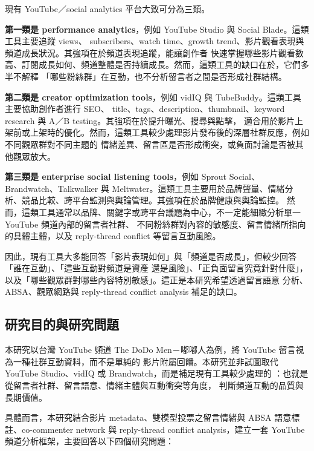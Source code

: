 現有 YouTube／social analytics 平台大致可分為三類。

\textbf{第一類是 performance analytics}，例如 YouTube Studio 與 Social Blade。這類工具主要追蹤 views、
subscribers、watch time、growth trend、影片觀看表現與頻道成長狀況。其強項在於頻道表現追蹤，能讓創作者
快速掌握哪些影片觀看數高、訂閱成長如何、頻道整體是否持續成長。然而，這類工具的缺口在於，它們多半不解釋
「哪些粉絲群」在互動，也不分析留言者之間是否形成社群結構。

\textbf{第二類是 creator optimization tools}，例如 vidIQ 與 TubeBuddy。這類工具主要協助創作者進行 SEO、
title、tags、description、thumbnail、keyword research 與 A／B testing。其強項在於提升曝光、搜尋與點擊，
適合用於影片上架前或上架時的優化。然而，這類工具較少處理影片發布後的深層社群反應，例如不同觀眾群對不同主題的
情緒差異、留言區是否形成衝突，或負面討論是否被其他觀眾放大。

\textbf{第三類是 enterprise social listening tools}，例如 Sprout Social、Brandwatch、Talkwalker 與
Meltwater。這類工具主要用於品牌聲量、情緒分析、競品比較、跨平台監測與輿論管理。其強項在於品牌健康與輿論監控。
然而，這類工具通常以品牌、關鍵字或跨平台議題為中心，不一定能細緻分析單一 YouTube 頻道內部的留言者社群、
不同粉絲群對內容的敏感度、留言情緒所指向的具體主體，以及 reply-thread conflict 等留言互動風險。

因此，現有工具大多能回答「影片表現如何」與「頻道是否成長」，但較少回答「誰在互動」、「這些互動對頻道是資產
還是風險」、「正負面留言究竟針對什麼」，以及「哪些觀眾群對哪些內容特別敏感」。這正是本研究希望透過留言語意
分析、ABSA、觀眾網路與 reply-thread conflict analysis 補足的缺口。

\subsection{研究目的與研究問題}

本研究以台灣 YouTube 頻道 The DoDo Men－嘟嘟人為例，將 YouTube 留言視為一種社群互動資料，而不是單純的
影片附屬回饋。本研究並非試圖取代 YouTube Studio、vidIQ 或 Brandwatch，而是補足現有工具較少處理的
：也就是從留言者社群、留言語意、情緒主體與互動衝突等角度，
判斷頻道互動的品質與長期價值。

具體而言，本研究結合影片 metadata、雙模型投票之留言情緒與 ABSA 語意標註、co-commenter network 與
reply-thread conflict analysis，建立一套 YouTube 頻道分析框架，主要回答以下四個研究問題：

